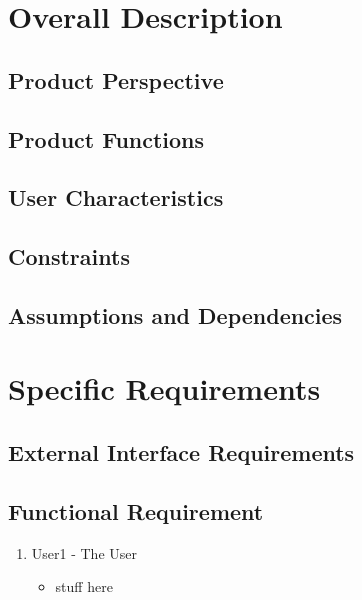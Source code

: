 \documentclass[11pt]{article}
\begin{document}
	\section{Overall Description}
	
		\subsection{Product Perspective}

		\subsection{Product Functions}

		\subsection{User Characteristics}

		\subsection{Constraints}

		\subsection{Assumptions and Dependencies}

	\section{Specific Requirements}
	
		\subsection{External Interface Requirements}

		\subsection{Functional Requirement}

			\begin{enumerate}
					\item User1 - The User
					\begin{itemize}
						\item stuff here
					\end{itemize}
			\end{enumerate}
\end{document}
